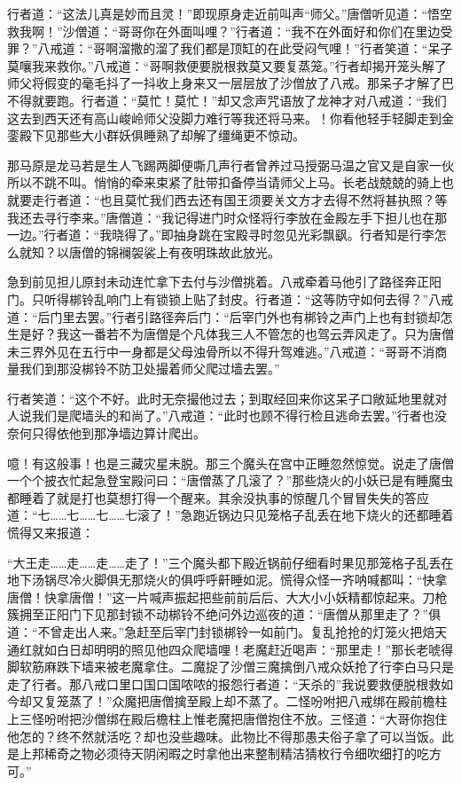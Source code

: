 \documentclass[12pt,UTF8]{ctexbook}
\begin{document}
{	行者道：“这法儿真是妙而且灵！”即现原身走近前叫声“师父。”唐僧听见道：“悟空救我啊！”沙僧道：“哥哥你在外面叫哩？”行者道：“我不在外面好和你们在里边受罪？”八戒道：“哥啊溜撒的溜了我们都是顶缸的在此受闷气哩！”行者笑道：“呆子莫嚷我来救你。”八戒道：“哥啊救便要脱根救莫又要复蒸笼。”行者却揭开笼头解了师父将假变的毫毛抖了一抖收上身来又一层层放了沙僧放了八戒。那呆子才解了巴不得就要跑。行者道：“莫忙！莫忙！”却又念声咒语放了龙神才对八戒道：“我们这去到西天还有高山峻岭师父没脚力难行等我还将马来。！你看他轻手轻脚走到金銮殿下见那些大小群妖俱睡熟了却解了缰绳更不惊动。
	
	那马原是龙马若是生人飞踢两脚便嘶几声行者曾养过马授弼马温之官又是自家一伙所以不跳不叫。悄悄的牵来束紧了肚带扣备停当请师父上马。长老战兢兢的骑上也就要走行者道：“也且莫忙我们西去还有国王须要关文方才去得不然将甚执照？等我还去寻行李来。”唐僧道：“我记得进门时众怪将行李放在金殿左手下担儿也在那一边。”行者道：“我晓得了。”即抽身跳在宝殿寻时忽见光彩飘飖。行者知是行李怎么就知？以唐僧的锦襕袈裟上有夜明珠故此放光。
	
	急到前见担儿原封未动连忙拿下去付与沙僧挑着。八戒牵着马他引了路径奔正阳门。只听得梆铃乱响门上有锁锁上贴了封皮。行者道：“这等防守如何去得？”八戒道：“后门里去罢。”行者引路径奔后门：“后宰门外也有梆铃之声门上也有封锁却怎生是好？我这一番若不为唐僧是个凡体我三人不管怎的也驾云弄风走了。只为唐僧未三界外见在五行中一身都是父母浊骨所以不得升驾难逃。”八戒道：“哥哥不消商量我们到那没梆铃不防卫处撮着师父爬过墙去罢。”
	
	行者笑道：“这个不好。此时无奈撮他过去；到取经回来你这呆子口敞延地里就对人说我们是爬墙头的和尚了。”八戒道：“此时也顾不得行检且逃命去罢。”行者也没奈何只得依他到那净墙边算计爬出。
	
	噫！有这般事！也是三藏灾星未脱。那三个魔头在宫中正睡忽然惊觉。说走了唐僧一个个披衣忙起急登宝殿问曰：“唐僧蒸了几滚了？”那些烧火的小妖已是有睡魔虫都睡着了就是打也莫想打得一个醒来。其余没执事的惊醒几个冒冒失失的答应道：“七……七……七……七滚了！”急跑近锅边只见笼格子乱丢在地下烧火的还都睡着慌得又来报道：
	
	“大王走……走……走……走了！”三个魔头都下殿近锅前仔细看时果见那笼格子乱丢在地下汤锅尽冷火脚俱无那烧火的俱呼呼鼾睡如泥。慌得众怪一齐呐喊都叫：“快拿唐僧！快拿唐僧！”这一片喊声振起把些前前后后、大大小小妖精都惊起来。刀枪簇拥至正阳门下见那封锁不动梆铃不绝问外边巡夜的道：“唐僧从那里走了？”俱道：“不曾走出人来。”急赶至后宰门封锁梆铃一如前门。复乱抢抢的灯笼火把焙天通红就如白日却明明的照见他四众爬墙哩！老魔赶近喝声：“那里走！”那长老唬得脚软筋麻跌下墙来被老魔拿住。二魔捉了沙僧三魔擒倒八戒众妖抢了行李白马只是走了行者。那八戒口里口国口国哝哝的报怨行者道：“天杀的”我说要救便脱根救如今却又复笼蒸了！”众魔把唐僧擒至殿上却不蒸了。二怪吩咐把八戒绑在殿前檐柱上三怪吩咐把沙僧绑在殿后檐柱上惟老魔把唐僧抱住不放。三怪道：“大哥你抱住他怎的？终不然就活吃？却也没些趣味。此物比不得那愚夫俗子拿了可以当饭。此是上邦稀奇之物必须待天阴闲暇之时拿他出来整制精洁猜枚行令细吹细打的吃方可。”
	
}
\end{document}
